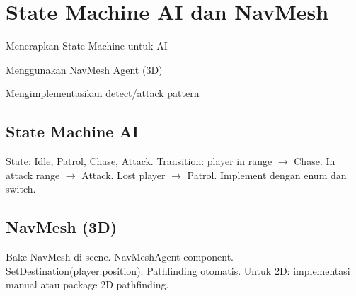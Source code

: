 \section{State Machine AI dan NavMesh}

\begin{learningoutcomes}
\item Menerapkan State Machine untuk AI
\item Menggunakan NavMesh Agent (3D)
\item Mengimplementasikan detect/attack pattern
\end{learningoutcomes}

\subsection{State Machine AI}

State: Idle, Patrol, Chase, Attack. Transition: player in range $\rightarrow$ Chase. In attack range $\rightarrow$ Attack. Lost player $\rightarrow$ Patrol. Implement dengan enum dan switch.

\subsection{NavMesh (3D)}

Bake NavMesh di scene. NavMeshAgent component. SetDestination(player.position). Pathfinding otomatis. Untuk 2D: implementasi manual atau package 2D pathfinding.
